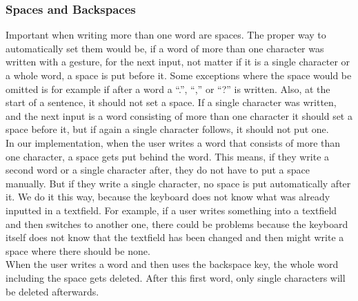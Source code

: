 \subsubsection{Spaces and Backspaces}
Important when writing more than one word are spaces. The proper way to automatically set them would be, if a word of more than one character was written with a gesture, for the next input, not matter if it is a single character or a whole word, a space is put before it. Some exceptions where the space would be omitted is for example if after a word a ``.'', ``,'' or ``?'' is written. Also, at the start of a sentence, it should not set a space. If a single character was written, and the next input is a word consisting of more than one character it should set a space before it, but if again a single character follows, it should not put one.\\
In our implementation, when the user writes a word that consists of more than one character, a space gets put behind the word. This means, if they write a second word or a single character after, they do not have to put a space manually. But if they write a single character, no space is put automatically after it. We do it this way, because the keyboard does not know what was already inputted in a textfield. For example, if a user writes something into a textfield and then switches to another one, there could be problems because the keyboard itself does not know that the textfield has been changed and then might write a space where there should be none.\\
When the user writes a word and then uses the backspace key, the whole word including the space gets deleted. After this first word, only single characters will be deleted afterwards.

